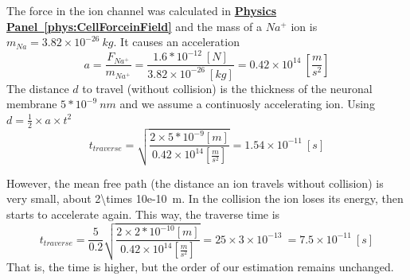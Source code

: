 \ifx\magyar\undefined
{}
{
The force in the ion channel was calculated in
\textbf{\hyperlink{phys:CellForceinField}{Physics Panel~\ref{phys:CellForceinField}}}
\noindent
and the mass of a $Na^+$ ion is $m_{Na} = 3.82\times 10^{-26}\ kg$.
It causes an acceleration
\begin{equation}
a=\frac{F_{Na^+}}{m_{Na^+}} = \frac{1.6*10^{-12}\ [N]}{ 3.82\times 10^{-26}\ [kg]} =
0.42 \times 10^{14}\ [\frac{m}{s^{2}}]
\label{eq:Physics-RushInAceleration}
\end{equation}
\noindent
The distance $d$ to travel (without collision) is the thickness of the neuronal membrane $5*10^{-9}\ nm$
and we assume a continuosly accelerating ion. Using $d=\frac{1}{2}\times a\times t^2$
\begin{equation}
t_{traverse} = \sqrt{\frac{2\times 5*10^{-9} [m]}{0.42\times 10^{14} [\frac{m}{s^{2}}]}} = 1.54\times 10^{-11}\ [s]
\end{equation}

However, the mean free path (the distance an ion travels without collision) is very small, about
\SI{2\times 10e-10}{\meter}. In the collision the
ion loses its energy, then starts to accelerate again.
This way, the traverse time is
%
\begin{equation}
t_{traverse} = \frac{5}{0.2}\sqrt{\frac{2\times 2*10^{-10} [m]}{0.42\times 10^{14} [\frac{m}{s^{2}}]}} = 25\times 3\times 10^{-13}\ = 7.5\times 10^{-11}\ [s]
\end{equation}
%
That is, the time is higher, but the order of our estimation remains unchanged.
}

\else

